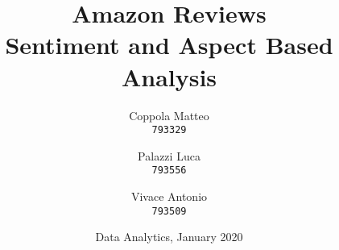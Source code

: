 \documentclass{report}
\begin{document}
\title{%
  \Huge Amazon Reviews \\
  \large Sentiment and Aspect Based Analysis\\
    }
\author{
  Coppola Matteo\\
  \texttt{793329}
  \and
  Palazzi Luca\\
  \texttt{793556}
   \and
  Vivace Antonio\\
  \texttt{793509}
}
\date{Data Analytics, January 2020}
\maketitle
\end{document}
